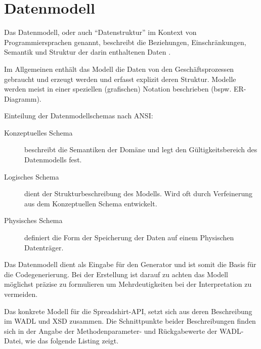 \chapter{Datenmodell}
\label{chap:datamodel}

\begin{thesisDefinition}[Datenmodell]
Das Datenmodell, oder auch \enquote{Datenstruktur} im Kontext von Programmiersprachen genannt, beschreibt die Beziehungen, Einschränkungen, Semantik und Struktur der darin enthaltenen Daten \cite{wiki:datamodel}.
\end{thesisDefinition}

Im Allgemeinen enthält das Modell die Daten von den Geschäftsprozessen gebraucht und erzeugt werden und erfasst explizit deren Struktur. Modelle werden meist in einer speziellen (grafischen) Notation beschrieben (bspw. ER-Diagramm). 

Einteilung der Datenmodellschemas nach ANSI: %
\begin{description}
    \item[Konzeptuelles Schema]
        beschreibt die Semantiken der Domäne und legt den Gültigkeitsbereich des Datenmodells fest.
    \item[Logisches Schema]
        dient der Strukturbeschreibung des Modells. Wird oft durch Verfeinerung aus dem Konzeptuellen Schema entwickelt.
    \item[Physisches Schema]
        definiert die Form der Speicherung der Daten auf einem Physischen Datenträger.
\end{description}

Das Datenmodell dient als Eingabe für den Generator und ist somit die Basis für die Codegenerierung. Bei der Erstellung ist darauf zu achten das Modell möglichst präzise zu formulieren um Mehrdeutigkeiten bei der Interpretation zu vermeiden. 

Das konkrete Modell für die Spreadshirt-API, setzt sich aus deren Beschreibung im \gls{WADL} und \gls{XSD} zusammen. Die Schnittpunkte beider Beschreibungen finden sich in der Angabe der Methodenparameter- und Rückgabewerte der \gls{WADL}-Datei, wie das folgende Listing zeigt.

